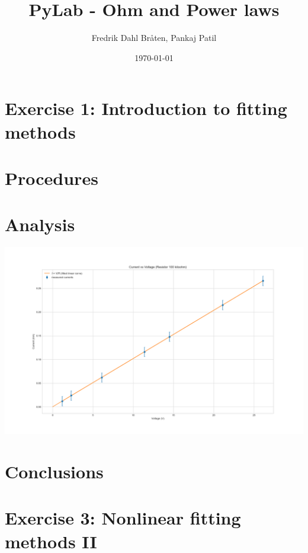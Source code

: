 \documentclass[letterpaper,12pt]{article}
\begin{document}
\title{PyLab - Ohm and Power laws}
\author{Fredrik Dahl Bråten, Pankaj Patil}
\date{\today}
\maketitle

\section*{Exercise 1:  Introduction to fitting methods}

\section{Procedures}


\section{Analysis}

\begin{center}
    \includegraphics[width=1.0\linewidth]{../lab_1_ex_1_plot.png}    
\end{center}

\section{Conclusions}

\pagebreak

\section*{Exercise 3:  Nonlinear fitting methods II}
\end{document}
